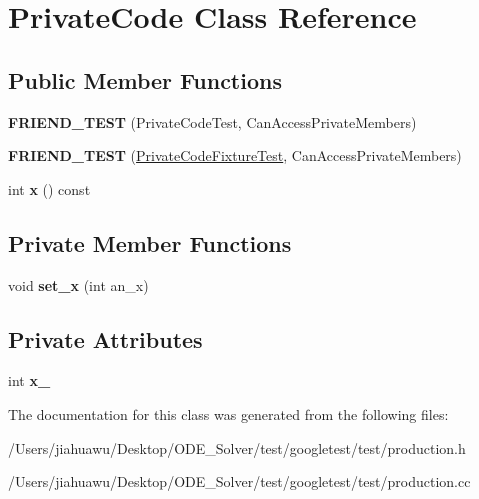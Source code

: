 \hypertarget{class_private_code}{}\section{Private\+Code Class Reference}
\label{class_private_code}
\subsection*{Public Member Functions}
\begin{DoxyCompactItemize}
\item 
\mbox{\label{class_private_code_a9a74a333501232539ab1636f0928d8f2}} 
{\bfseries F\+R\+I\+E\+N\+D\+\_\+\+T\+E\+ST} (Private\+Code\+Test, Can\+Access\+Private\+Members)
\item 
\mbox{\label{class_private_code_a29b6823300f68d78691476eeeaed8a7c}} 
{\bfseries F\+R\+I\+E\+N\+D\+\_\+\+T\+E\+ST} (\mbox{\hyperlink{classtesting_1_1_test}{Private\+Code\+Fixture\+Test}}, Can\+Access\+Private\+Members)
\item 
\mbox{\label{class_private_code_a247781246ce4d0c66563eaa39ba5aaa9}} 
int {\bfseries x} () const
\end{DoxyCompactItemize}
\subsection*{Private Member Functions}
\begin{DoxyCompactItemize}
\item 
\mbox{\label{class_private_code_a8d8ac6564d6425ea793f85848bb21b39}} 
void {\bfseries set\+\_\+x} (int an\+\_\+x)
\end{DoxyCompactItemize}
\subsection*{Private Attributes}
\begin{DoxyCompactItemize}
\item 
\mbox{\label{class_private_code_a3590a614d8c76fa34fa4cea6f340c37f}} 
int {\bfseries x\+\_\+}
\end{DoxyCompactItemize}


The documentation for this class was generated from the following files\+:\begin{DoxyCompactItemize}
\item 
/\+Users/jiahuawu/\+Desktop/\+O\+D\+E\+\_\+\+Solver/test/googletest/test/production.\+h\item 
/\+Users/jiahuawu/\+Desktop/\+O\+D\+E\+\_\+\+Solver/test/googletest/test/production.\+cc\end{DoxyCompactItemize}
